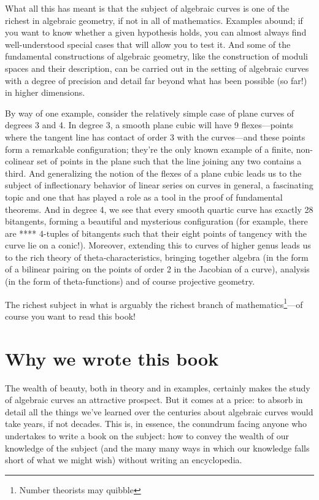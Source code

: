 What all this has meant is that the subject of algebraic curves is one of the richest in algebraic geometry, if not in all of mathematics. Examples abound; if you want to know whether a given hypothesis holds, you can almost always find well-understood special cases that will allow you to test it. And some of the fundamental constructions of algebraic geometry, like the construction of moduli spaces and their description, can be carried out in the setting of algebraic curves with a degree of precision and detail far beyond what has been possible (so far!) in higher dimensions. 

By way of one example, consider the relatively simple case of plane curves of degrees 3 and 4. In degree 3, a smooth plane cubic will have 9 flexes---points where the tangent line has contact of order 3 with the curves---and these points form a remarkable configuration; they're the only known example of a finite, non-colinear set of points in the plane such that the line joining any two contains a third. And generalizing the notion of the flexes of a plane cubic leads us to the subject of inflectionary behavior of linear series on curves in general, a fascinating topic and one that has played a role as a tool in the proof of fundamental theorems. And in degree 4, we see that every smooth quartic curve has exactly 28 bitangents, forming a beautiful and mysterious configuration (for example, there are **** 4-tuples of bitangents such that their eight points of tangency with the curve lie on a conic!). Moreover, extending this to curves of higher genus leads us to the rich theory of theta-characteristics, bringing together algebra (in the form of a bilinear pairing on the points of order 2 in the Jacobian of a curve), analysis (in the form of theta-functions) and of course projective geometry.

The richest subject in what is arguably the richest branch of mathematics\footnote{Number theorists may quibble}---of course you want to read this book! 

\section{Why we wrote this book}

The wealth of beauty, both in theory and in examples, certainly makes the study of algebraic curves an attractive prospect. But it comes at a price: to absorb in detail all the things we've learned over the centuries about algebraic curves would take years, if not decades. This is, in essence, the conundrum facing anyone who undertakes to write a book on the subject: how to convey the wealth of our knowledge of the subject (and the many many ways in which our knowledge falls short of what we might wish) without writing an encyclopedia.

